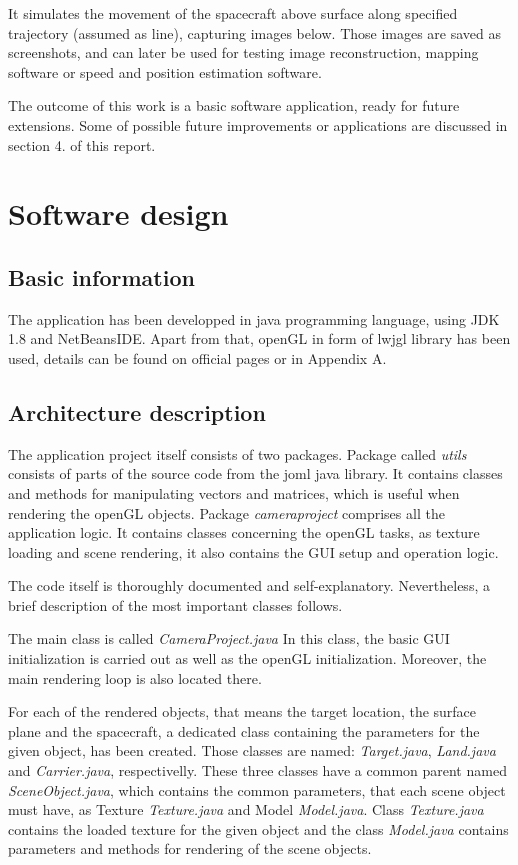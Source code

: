 \documentclass[english,12pt,a4paper,pdftex,elec,utf8]{aaltothesis}
\begin{document}
It simulates the movement of the spacecraft above surface along specified trajectory (assumed as line), capturing images below. Those images are saved as screenshots, and can later be used for testing image reconstruction, mapping software or speed and position estimation software.

The outcome of this work is a basic software application, ready for future extensions. Some of possible future improvements or applications are discussed in section 4. of this report.

\clearpage

\section{Software design}
\subsection*{Basic information}
The application has been developped in java programming language, using JDK 1.8\cite{java} and NetBeansIDE\cite{NetBeans}. Apart from that, openGL in form of lwjgl \cite{lwjgl} library has been used, details can be found on official pages or in Appendix A.

\subsection*{Architecture description}
The application project itself consists of two packages. 
Package called \textit{utils} consists of parts of the source code from the joml java library. It contains classes and methods for manipulating vectors and matrices, which is useful when rendering the openGL objects. 
Package \textit{cameraproject} comprises all the application logic. It contains classes concerning the openGL tasks, as texture loading and scene rendering, it also contains the GUI setup and operation logic.

The code itself is thoroughly documented and self-explanatory. Nevertheless, a brief description of the most important classes follows.

The main class is called \textit{CameraProject.java} In this class, the basic GUI initialization is carried out as well as the openGL initialization. Moreover, the main rendering loop is also located there.

For each of the rendered objects, that means the target location, the surface plane and the spacecraft, a dedicated class containing the parameters for the given object, has been created. Those classes are named: \textit{Target.java}, \textit{Land.java} and \textit{Carrier.java}, respectivelly. These three classes have a common parent named \textit{SceneObject.java}, which contains the common parameters, that each scene object must have, as Texture \textit{Texture.java} and Model \textit{Model.java}. Class \textit{Texture.java} contains the loaded texture for the given object and the class \textit{Model.java} contains parameters and methods for rendering of the scene objects.
\end{document}
